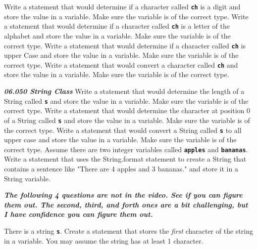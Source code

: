 \documentclass[letterpaper,11pt]{exam}
\newcommand{\videoheading}[1]{\Large\textbf{\textit{#1}}}
\begin{document}
\begin{questions}
\question Write a statement that would determine if a character called \texttt{\textbf{ch}} is a digit and store the value in a variable.  Make sure the variable is of the correct type.
\vspace{1cm}
\question Write a statement that would determine if a character called \texttt{\textbf{ch}} is a letter of the alphabet and store the value in a variable.  Make sure the variable is of the correct type.
\vspace{1cm}
\question Write a statement that would determine if a character called \texttt{\textbf{ch}} is upper Case and store the value in a variable.  Make sure the variable is of the correct type.
\vspace{1cm}
\question Write a statement that would convert a character called \texttt{\textbf{ch}} and store the value in a variable.  Make sure the variable is of the correct type.
\vspace{1cm}

\videoheading{06.050 String Class}
\question Write a statement that would determine the length of a String called \texttt{\textbf{s}} and store the value in a variable.  Make sure the variable is of the correct type.
\vspace{1cm}
\question Write a statement that would determine the character at position 0 of a String called \texttt{\textbf{s}} and store the value in a variable.  Make sure the variable is of the correct type.
\vspace{1cm}
\question Write a statement that would convert a String called \texttt{\textbf{s}} to all upper case and store the value in a variable.  Make sure the variable is of the correct type.
\vspace{1cm}
\question Assume there are two integer variables called \texttt{\textbf{apples}} and \texttt{\textbf{bananas}}.  Write a statement that uses the String.format statement to create a String that contains a sentence like "There are 4 apples and 3 bananas." and store it in a String variable.
\vspace{1cm}

\videoheading{The following 4 questions are not in the video.  See if you can figure them out.  The second, third, and forth  ones are a bit challenging, but I have confidence you can figure them out.}

\question There is a string \texttt{\textbf{s}}.  Create a statement that stores the \textit{first} character of the string in a variable.  You may assume the string has at least 1 character.
\vspace{1cm}


\end{questions}
\end{document}
